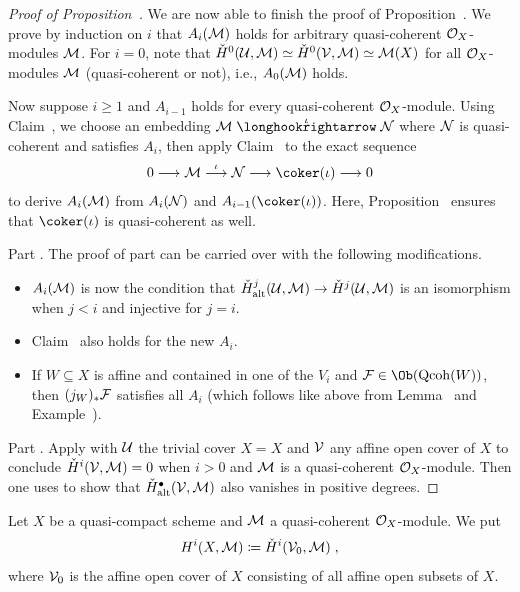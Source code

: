 \documentclass[a4paper,parskip=half,numbers=enddot, DIV=12]{scrreprt}
\begin{document}
\begin{proof}[Proof of Proposition~]
	We are now able to finish the proof of Proposition~. We prove by induction on $i$ that $A_i(\mathcal{M})$ holds for arbitrary quasi-coherent $\mathcal{O}_X$-modules $\mathcal{M}$.  For $i=0$, note that $\check{H}^0(\mathcal{U},\mathcal{M})\simeq \check{H}^0(\mathcal{V},\mathcal{M})\simeq \mathcal{M}(X)$ for all $\mathcal{O}_X$-modules $\mathcal{M}$ (quasi-coherent or not), i.e., $A_0(\mathcal{M})$ holds. 
	
	Now suppose $i\geq 1$ and $A_{i-1}$ holds for every quasi-coherent $\mathcal{O}_X$-module. Using Claim~, we choose an embedding $\Mm\monomorphism[\iota]\Nn$ where $\mathcal{N}$ is quasi-coherent and satisfies $A_i$, then apply Claim~ to the exact sequence
	\begin{align*}
		0\morphism\Mm\morphism[\iota]\Nn\morphism\coker(\iota)\morphism 0
	\end{align*}
	to derive $A_i(\mathcal{M})$ from $A_i(\mathcal{N})$ and $A_{i-1}(\coker(\iota))$. Here, Proposition~ ensures that $\coker(\iota)$ is quasi-coherent as well.
	
	Part . The proof of part  can be carried over with the following modifications.
	\begin{itemize}
		\item $A_i(\mathcal{M})$ is now the condition that $\check{H}_\alt^j(\Uu,\Mm)\morphism \check{H}^j(\Uu,\Mm)$ is an isomorphism when $j<i$ and injective for $j=i$.
		\item Claim~ also holds for the new $A_i$.
		\item If $W\subseteq X$ is affine and contained in one of the $V_i$ and $\Ff\in\Ob(\cat{Qcoh}(W))$, then $(j_W)_*\mathcal{F}$ satisfies all $A_i$ (which follows like above from Lemma~ and Example~).
	\end{itemize}
	
	Part . Apply  with $\mathcal{U}$ the trivial cover $X=X$ and $\mathcal{V}$ any affine open cover of $X$ to conclude $\check{H}^i(\mathcal{V},\mathcal{M})=0$ when $i>0$ and $\mathcal{M}$ is a quasi-coherent $\mathcal{O}_X$-module. Then one uses  to show that $\check{H}_{\mathrm{alt}}^\bullet (\mathcal{V},\mathcal{M})$ also vanishes in positive degrees.
\end{proof}
\begin{defi}
	Let $X$ be a quasi-compact scheme and $\mathcal{M}$ a quasi-coherent $\mathcal{O}_X$-module. We put
	\begin{align*}
		H^i(X,\mathcal{M})\coloneqq \check{H}^i(\mathcal{V}_0,\mathcal{M})\;,
	\end{align*}
	where $\mathcal{V}_0$ is the affine open cover of $X$ consisting of all affine open subsets of $X$.
\end{defi}
\end{document}
